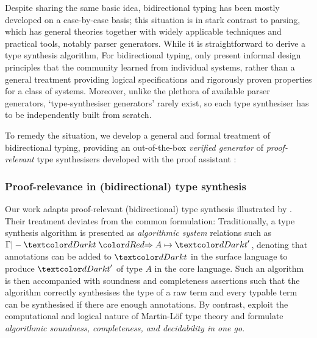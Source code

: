 
Despite sharing the same basic idea, bidirectional typing has been mostly developed on a case-by-case basis; this situation is in stark contrast to parsing, which has general theories together with widely applicable techniques and practical tools, notably parser generators.
While it is straightforward to derive a type synthesis algorithm,
For bidirectional typing, \citeauthor{Dunfield2021} only present informal design principles that the community learned from individual systems, rather than a general treatment providing logical specifications and rigorously proven properties for a class of systems.
Moreover, unlike the plethora of available parser generators, `type-synthesiser generators' rarely exist, so each type synthesiser has to be independently built from scratch.

To remedy the situation, we develop a general and formal treatment of bidirectional typing, providing an out-of-the-box \emph{verified generator} of \emph{proof-relevant} type synthesisers developed with the proof assistant \Agda:

\subsubsection{Proof-relevance in (bidirectional) type synthesis}
\label{sec:PLFA}

Our work adapts proof-relevant (bidirectional) type synthesis illustrated by \citet{Wadler2022}.
Their treatment deviates from the common formulation: 
Traditionally, a type synthesis algorithm is presented as \emph{algorithmic system} relations such as $\Gamma |- \isTerm{t} \syn A \mapsto \isTerm{t}'$, denoting that annotations can be added to $\isTerm{t}$ in the surface language to produce $\isTerm{t}'$ of type $A$ in the core language.
Such an algorithm is then accompanied with soundness and completeness assertions such that the algorithm correctly synthesises the type of a raw term and every typable term can be synthesised if there are enough annotations.
By contrast, \citeauthor{Wadler2022} exploit the computational and logical nature of Martin-L\"of type theory and formulate \emph{algorithmic soundness, completeness, and decidability in one go}.

